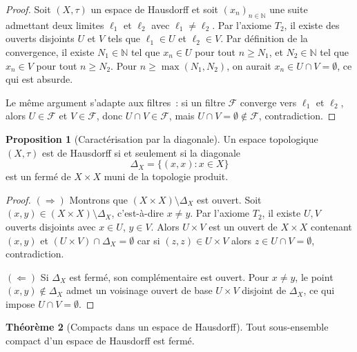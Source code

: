 \documentclass[12pt,a4paper,openany]{book}
\theoremstyle{definition}
\theoremstyle{cours}
\newtheorem{theoreme}{Théorème}[chapter]
\newtheorem{proposition}[theoreme]{Proposition}
\theoremstyle{coursnormal}
\newcommand{\N}{\mathbb{N}}
\begin{document}
\begin{proof}
  Soit $(X,\tau)$ un espace de Hausdorff et soit $(x_n)_{n\in\N}$ une suite
  admettant deux limites $\ell_1$ et $\ell_2$ avec $\ell_1\neq\ell_2$. Par
  l'axiome $T_2$, il existe des ouverts disjoints $U$ et $V$ tels que
  $\ell_1\in U$ et $\ell_2\in V$. Par définition de la convergence, il existe
  $N_1\in\N$ tel que $x_n\in U$ pour tout $n\geq N_1$, et $N_2\in\N$ tel que
  $x_n\in V$ pour tout $n\geq N_2$. Pour $n\geq\max(N_1,N_2)$, on aurait
  $x_n\in U\cap V=\emptyset$, ce qui est absurde.

  \medskip
  Le même argument s'adapte aux filtres~: si un filtre $\mathcal{F}$ converge
  vers $\ell_1$ et $\ell_2$, alors $U\in\mathcal{F}$ et $V\in\mathcal{F}$,
  donc $U\cap V\in\mathcal{F}$, mais $U\cap V=\emptyset\notin\mathcal{F}$,
  contradiction.
\end{proof}

\begin{proposition}[Caractérisation par la diagonale]\label{prop:diagonale}
  Un espace topologique $(X,\tau)$ est de Hausdorff si et seulement si la
  diagonale
  \[
    \Delta_X = \{(x,x) : x\in X\}
  \]
  est un fermé de $X\times X$ muni de la topologie produit.
\end{proposition}

\begin{proof}
  $(\Rightarrow)$ Montrons que $(X\times X)\setminus\Delta_X$ est ouvert. Soit
  $(x,y)\in(X\times X)\setminus\Delta_X$, c'est-à-dire $x\neq y$. Par
  l'axiome $T_2$, il existe $U,V$ ouverts disjoints avec $x\in U$, $y\in V$.
  Alors $U\times V$ est un ouvert de $X\times X$ contenant $(x,y)$ et
  $(U\times V)\cap\Delta_X=\emptyset$ car si $(z,z)\in U\times V$ alors
  $z\in U\cap V=\emptyset$, contradiction.

  \medskip
  $(\Leftarrow)$ Si $\Delta_X$ est fermé, son complémentaire est ouvert. Pour
  $x\neq y$, le point $(x,y)\notin\Delta_X$ admet un voisinage ouvert de base
  $U\times V$ disjoint de $\Delta_X$, ce qui impose $U\cap V=\emptyset$.
\end{proof}

\begin{theoreme}[Compacts dans un espace de Hausdorff]\label{thm:compact-hausdorff-ferme}
  Tout sous-ensemble compact d'un espace de Hausdorff est fermé.
\end{theoreme}
\end{document}
